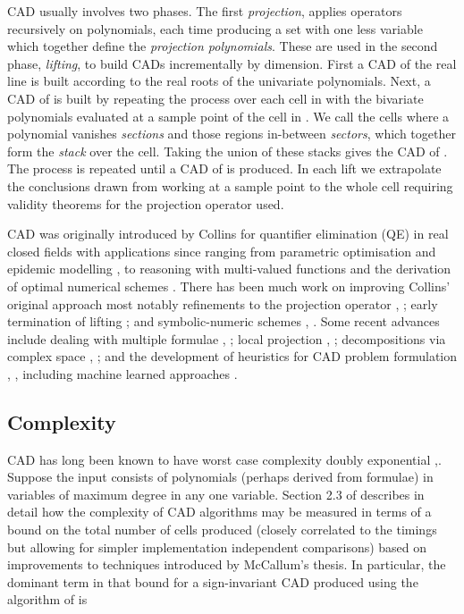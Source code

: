 \documentclass{llncs}
\begin{document}
CAD usually involves two phases.  The first {\em projection}, applies operators recursively on  polynomials, each time producing a set with one less variable which together define the {\em projection polynomials}.  These are used in the second phase, {\em lifting}, to build CADs incrementally by dimension.  First a CAD of the real line is built according to the real roots of the univariate polynomials. Next, a CAD of  is built by repeating the process over each cell in  with the bivariate polynomials evaluated at a sample point of the cell in .  We call the cells where a polynomial vanishes {\em sections} and those regions in-between {\em sectors}, which together form the {\em stack} over the cell.  Taking the union of these stacks gives the CAD of .  The process is repeated until a CAD of  is produced.  In each lift we extrapolate the conclusions drawn from working at a sample point to the whole cell requiring validity theorems for the projection operator used.

CAD was originally introduced by Collins for quantifier elimination (QE) in real closed fields \cite{ACM84I} with applications since ranging from parametric optimisation \cite{FPM05} and epidemic modelling \cite{BENW06}, to reasoning with multi-valued functions \cite{DBEW12} and the derivation of optimal numerical schemes \cite{EH14}. 
There has been much work on improving Collins' original approach most notably refinements to the projection operator \cite{McCallum1998} \cite{Brown2001a}, \cite{HDX14}; early termination of lifting \cite{CH91} \cite{WBDE14}; and symbolic-numeric schemes \cite{Strzebonski2006}, \cite{IYAY09}.  Some recent advances include dealing with multiple formulae \cite{BDEMW13}, \cite{BDEMW16}; local projection \cite{Brown2013}, \cite{Strzebonski2014a}; decompositions via complex space \cite{CMXY09}, \cite{BCDEMW14}; and the development of heuristics for CAD problem formulation \cite{BDEW13}, \cite{EBCDMW14}, \cite{WEBD14} including machine learned approaches \cite{HEWDPB14}.



\subsection{Complexity}

CAD has long been known to have worst case complexity doubly exponential \cite{BD07},\cite{DH88}. Suppose the input consists of  polynomials (perhaps derived from formulae) in  variables of maximum degree  in any one variable.  Section 2.3 of \cite{BDEMW16} describes in detail how the complexity of CAD algorithms may be measured in terms of a bound on the total number of cells produced (closely correlated to the timings but allowing for simpler implementation independent comparisons) based on improvements to techniques introduced by McCallum's thesis.  In particular, the dominant term in that bound for a sign-invariant CAD produced using the algorithm of \cite{McCallum1998} is
\end{document}

